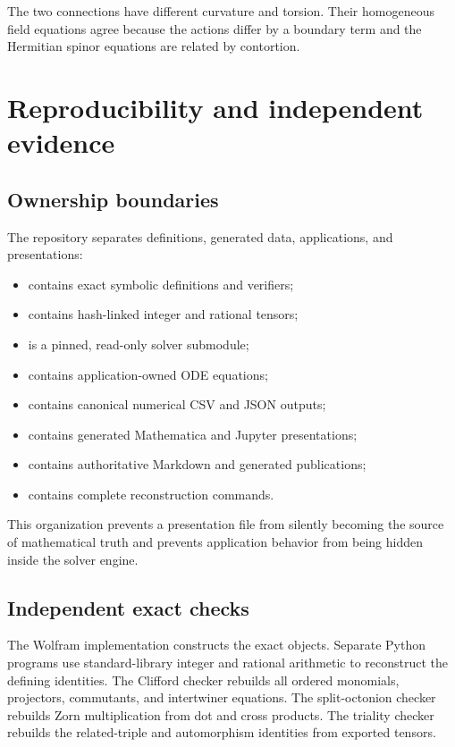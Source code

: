 \documentclass[11pt]{article}
\begin{document}
The two connections have different curvature and torsion. Their homogeneous field equations agree because the actions differ by a boundary term and the Hermitian spinor equations are related by contortion.

\section{Reproducibility and independent evidence}

\subsection{Ownership boundaries}

The repository separates definitions, generated data, applications, and presentations:

\begin{itemize}
\item \texttt{} contains exact symbolic definitions and verifiers;
\item \texttt{} contains hash-linked integer and rational tensors;
\item \texttt{} is a pinned, read-only solver submodule;
\item \texttt{} contains application-owned ODE equations;
\item \texttt{} contains canonical numerical CSV and JSON outputs;
\item \texttt{} contains generated Mathematica and Jupyter presentations;
\item \texttt{} contains authoritative Markdown and generated publications;
\item \texttt{} contains complete reconstruction commands.
\end{itemize}

This organization prevents a presentation file from silently becoming the source of mathematical truth and prevents application behavior from being hidden inside the solver engine.

\subsection{Independent exact checks}

The Wolfram implementation constructs the exact objects. Separate Python programs use standard-library integer and rational arithmetic to reconstruct the defining identities. The Clifford checker rebuilds all ordered monomials, projectors, commutants, and intertwiner equations. The split-octonion checker rebuilds Zorn multiplication from dot and cross products. The triality checker rebuilds the related-triple and automorphism identities from exported tensors.
\end{document}
